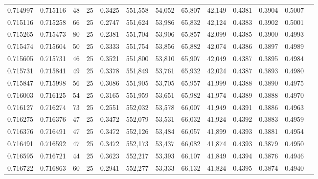 \begin{tabular}{rrrrrrrrrrrrr}
0.714997 & 0.715116 &    48 &  25 &                                     0.3425 & 551,558 &  54,052 &  65,807 &  42,149 & 0.4381 & 0.3904 & 0.5007 \\
0.715116 & 0.715258 &    66 &  25 &                                     0.2747 & 551,624 &  53,986 &  65,832 &  42,124 & 0.4383 & 0.3902 & 0.5001 \\
0.715265 & 0.715473 &    80 &  25 &                                     0.2381 & 551,704 &  53,906 &  65,857 &  42,099 & 0.4385 & 0.3900 & 0.4993 \\
0.715474 & 0.715604 &    50 &  25 &                                     0.3333 & 551,754 &  53,856 &  65,882 &  42,074 & 0.4386 & 0.3897 & 0.4989 \\
0.715605 & 0.715731 &    46 &  25 &                                     0.3521 & 551,800 &  53,810 &  65,907 &  42,049 & 0.4387 & 0.3895 & 0.4984 \\
0.715731 & 0.715841 &    49 &  25 &                                     0.3378 & 551,849 &  53,761 &  65,932 &  42,024 & 0.4387 & 0.3893 & 0.4980 \\
0.715847 & 0.715998 &    56 &  25 &                                     0.3086 & 551,905 &  53,705 &  65,957 &  41,999 & 0.4388 & 0.3890 & 0.4975 \\
0.716003 & 0.716125 &    54 &  25 &                                     0.3165 & 551,959 &  53,651 &  65,982 &  41,974 & 0.4389 & 0.3888 & 0.4970 \\
0.716127 & 0.716274 &    73 &  25 &                                     0.2551 & 552,032 &  53,578 &  66,007 &  41,949 & 0.4391 & 0.3886 & 0.4963 \\
0.716275 & 0.716376 &    47 &  25 &                                     0.3472 & 552,079 &  53,531 &  66,032 &  41,924 & 0.4392 & 0.3883 & 0.4959 \\
0.716376 & 0.716491 &    47 &  25 &                                     0.3472 & 552,126 &  53,484 &  66,057 &  41,899 & 0.4393 & 0.3881 & 0.4954 \\
0.716491 & 0.716592 &    47 &  25 &                                     0.3472 & 552,173 &  53,437 &  66,082 &  41,874 & 0.4393 & 0.3879 & 0.4950 \\
0.716595 & 0.716721 &    44 &  25 &                                     0.3623 & 552,217 &  53,393 &  66,107 &  41,849 & 0.4394 & 0.3876 & 0.4946 \\
0.716722 & 0.716863 &    60 &  25 &                                     0.2941 & 552,277 &  53,333 &  66,132 &  41,824 & 0.4395 & 0.3874 & 0.4940 \\

\end{tabular}
